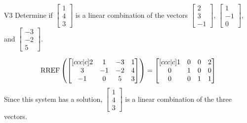 \begin{problem}{V3}
Determine if \(\begin{bmatrix} 1 \\ 4 \\ 3 \end{bmatrix}\) is a linear combination of the vectors \(\begin{bmatrix} 2 \\ 3 \\ -1 \end{bmatrix}\), \(\begin{bmatrix} 1 \\ -1 \\ 0 \end{bmatrix}\), and \(\begin{bmatrix} -3 \\ -2 \\ 5 \end{bmatrix}\).
\end{problem}
\begin{solution}
\[\operatorname{RREF}\left( \begin{bmatrix}[ccc|c] 2 & 1 & -3  & 1 \\ 3 & -1 & -2 & 4 \\ -1 & 0 & 5 & 3 \end{bmatrix} \right) = \begin{bmatrix}[ccc|c] 1 & 0 & 0 & 2 \\ 0 & 1 & 0 & 0 \\ 0 & 0 &  1 & 1 \end{bmatrix}\]
Since this system has a solution,  \(\begin{bmatrix} 1 \\ 4 \\ 3 \end{bmatrix}\) is a linear combination of the three vectors.
\end{solution}

